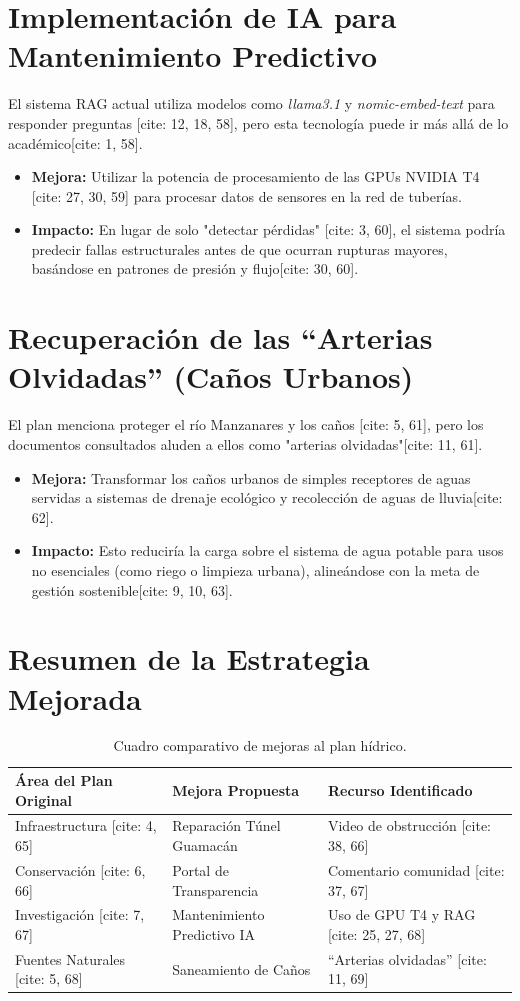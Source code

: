 \documentclass[12pt, a4paper]{article}
\begin{document}
\section{Implementación de IA para Mantenimiento Predictivo}
El sistema RAG actual utiliza modelos como \textit{llama3.1} y \textit{nomic-embed-text} para responder preguntas [cite: 12, 18, 58], pero esta tecnología puede ir más allá de lo académico[cite: 1, 58].

\begin{itemize}
    \item \textbf{Mejora:} Utilizar la potencia de procesamiento de las GPUs NVIDIA T4 [cite: 27, 30, 59] para procesar datos de sensores en la red de tuberías.
    \item \textbf{Impacto:} En lugar de solo "detectar pérdidas" [cite: 3, 60], el sistema podría predecir fallas estructurales antes de que ocurran rupturas mayores, basándose en patrones de presión y flujo[cite: 30, 60].
\end{itemize}

\section{Recuperación de las ``Arterias Olvidadas'' (Caños Urbanos)}
El plan menciona proteger el río Manzanares y los caños [cite: 5, 61], pero los documentos consultados aluden a ellos como "arterias olvidadas"[cite: 11, 61].

\begin{itemize}
    \item \textbf{Mejora:} Transformar los caños urbanos de simples receptores de aguas servidas a sistemas de drenaje ecológico y recolección de aguas de lluvia[cite: 62].
    \item \textbf{Impacto:} Esto reduciría la carga sobre el sistema de agua potable para usos no esenciales (como riego o limpieza urbana), alineándose con la meta de gestión sostenible[cite: 9, 10, 63].
\end{itemize}

\newpage
\section*{Resumen de la Estrategia Mejorada}

\begin{table}[h!]
\centering
\begin{tabular}{@{}lll@{}}
\toprule
\textbf{Área del Plan Original} & \textbf{Mejora Propuesta} & \textbf{Recurso Identificado} \\ \midrule
Infraestructura [cite: 4, 65] & Reparación Túnel Guamacán & Video de obstrucción [cite: 38, 66] \\
Conservación [cite: 6, 66] & Portal de Transparencia & Comentario comunidad [cite: 37, 67] \\
Investigación [cite: 7, 67] & Mantenimiento Predictivo IA & Uso de GPU T4 y RAG [cite: 25, 27, 68] \\
Fuentes Naturales [cite: 5, 68] & Saneamiento de Caños & ``Arterias olvidadas'' [cite: 11, 69] \\ \bottomrule
\end{tabular}
\caption{Cuadro comparativo de mejoras al plan hídrico.}
\end{table}
\end{document}
